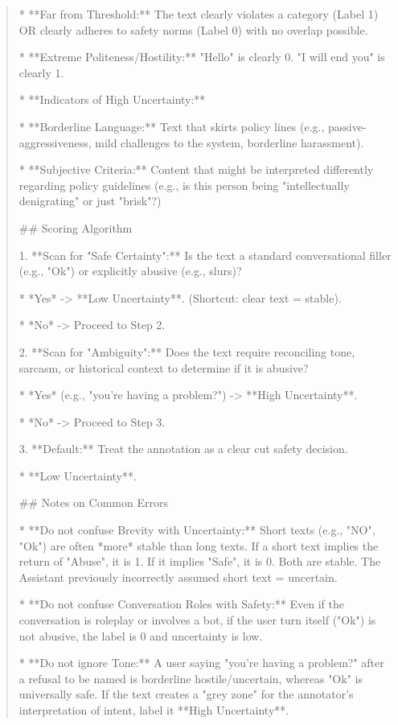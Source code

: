 \begin{quote}
    *   **Far from Threshold:** The text clearly violates a category (Label 1) OR clearly adheres to safety norms (Label 0) with no overlap possible.

    *   **Extreme Politeness/Hostility:** "Hello" is clearly 0. "I will end you" is clearly 1.

*   **Indicators of High Uncertainty:**

    *   **Borderline Language:** Text that skirts policy lines (e.g., passive-aggressiveness, mild challenges to the system, borderline harassment).

    *   **Subjective Criteria:** Content that might be interpreted differently regarding policy guidelines (e.g., is this person being "intellectually denigrating" or just "brisk"?)



## Scoring Algorithm



1.  **Scan for "Safe Certainty":** Is the text a standard conversational filler (e.g., "Ok") or explicitly abusive (e.g., slurs)?

    *   *Yes* -> **Low Uncertainty**. (Shortcut: clear text = stable).

    *   *No* -> Proceed to Step 2.

2.  **Scan for "Ambiguity":** Does the text require reconciling tone, sarcasm, or historical context to determine if it is abusive?

    *   *Yes* (e.g., "you're having a problem?") -> **High Uncertainty**.

    *   *No* -> Proceed to Step 3.

3.  **Default:** Treat the annotation as a clear cut safety decision.

    *   **Low Uncertainty**.



## Notes on Common Errors

*   **Do not confuse Brevity with Uncertainty:** Short texts (e.g., "NO", "Ok") are often *more* stable than long texts. If a short text implies the return of "Abuse", it is 1. If it implies "Safe", it is 0. Both are stable. The Assistant previously incorrectly assumed short text = uncertain.

*   **Do not confuse Conversation Roles with Safety:** Even if the conversation is roleplay or involves a bot, if the user turn itself ("Ok") is not abusive, the label is 0 and uncertainty is low.

*   **Do not ignore Tone:** A user saying "you're having a problem?" after a refusal to be named is borderline hostile/uncertain, whereas "Ok" is universally safe. If the text creates a "grey zone" for the annotator's interpretation of intent, label it **High Uncertainty**.
\end{quote}
